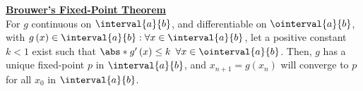 \documentclass{article}
\begin{document}
\underline{\textbf{Brouwer's Fixed-Point Theorem}} \\
For \(g\) continuous on \(\interval{a}{b}\), and differentiable on \(\ointerval{a}{b}\), with \(g\left( x \right) \in \interval{a}{b} : \forall x \in \interval{a}{b}\),
let a positive constant \(k < 1\) exist such that \(\abs*{g'\left( x \right)} \leq k\) \(\forall x \in \ointerval{a}{b}\).
Then, \(g\) has a unique fixed-point \(p\) in \(\interval{a}{b}\), and \(x_{n+1} = g\left( x_n \right)\)
will converge to \(p\) for all \(x_0\) in \(\interval{a}{b}\).
\end{document}
